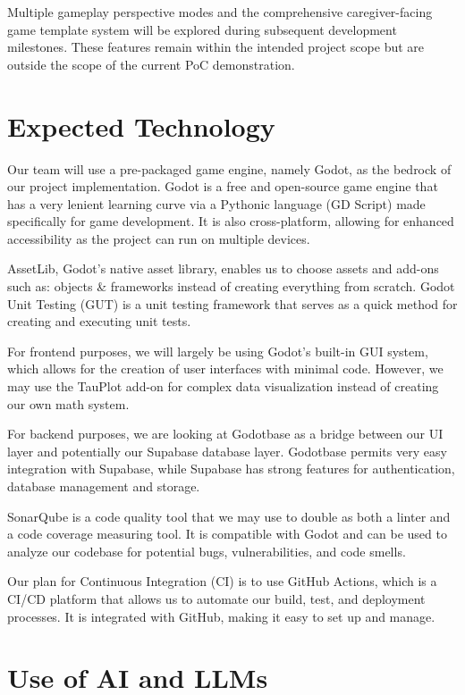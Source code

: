 \documentclass{article}
\begin{document}
Multiple gameplay perspective modes and the comprehensive caregiver-facing game template system will be explored during subsequent development milestones. These features remain within the intended project scope but are outside the scope of the current PoC demonstration.

\par\medskip

\section{Expected Technology}

Our team will use a pre-packaged game engine, namely Godot, as the bedrock of our project implementation. Godot is a free and open-source game engine that has a very lenient learning curve via a Pythonic language (GD Script) made specifically for game development. It is also cross-platform, allowing for enhanced accessibility as the project can run on multiple devices.

AssetLib, Godot's native asset library, enables us to choose assets and add-ons such as: objects \& frameworks instead of creating everything from scratch. Godot Unit Testing (GUT) is a unit testing framework that serves as a quick method for creating and executing unit tests.

For frontend purposes, we will largely be using Godot's built-in GUI system, which allows for the creation of user interfaces with minimal code. However, we may use the TauPlot add-on for complex data visualization instead of creating our own math system.

For backend purposes, we are looking at Godotbase as a bridge between our UI layer and potentially our Supabase database layer. Godotbase permits very easy integration with Supabase, while Supabase has strong features for authentication, database management and storage. 

SonarQube is a code quality tool that we may use to double as both a linter and a code coverage measuring tool. It is compatible with Godot and can be used to analyze our codebase for potential bugs, vulnerabilities, and code smells.

Our plan for Continuous Integration (CI) is to use GitHub Actions, which is a CI/CD platform that allows us to automate our build, test, and deployment processes. It is integrated with GitHub, making it easy to set up and manage.


\section{Use of AI and LLMs}
\end{document}
